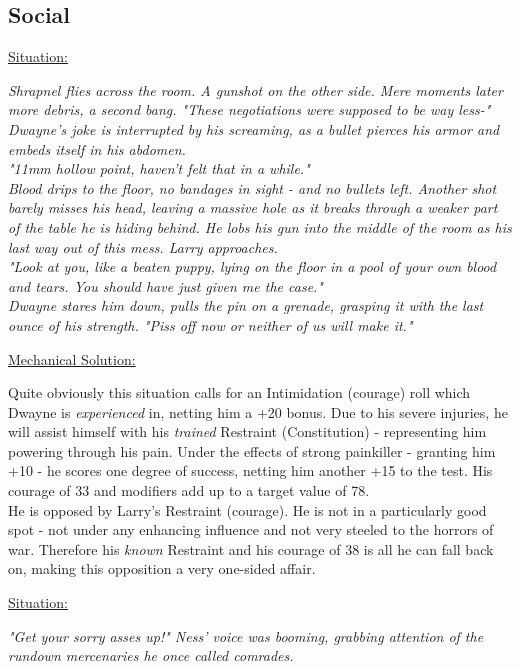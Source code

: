 \pagebreak
\begin{multicols}{2}
	\subsection*{Social}
	\ul{Situation:}
	\begin{exampleblock}
		\textit{Shrapnel flies across the room. A gunshot on the other side. Mere moments later more debris, a second bang.
			"These negotiations were supposed to be way less-"\\
			Dwayne's joke is interrupted by his screaming, as a bullet pierces his armor and embeds itself in his abdomen.\\
			"11mm hollow point, haven't felt that in a while."\\
			Blood drips to the floor, no bandages in sight - and no bullets left. Another shot barely misses his head, leaving a massive hole as it breaks through a weaker part of the table he is hiding behind. He lobs his gun into the middle of the room as his last way out of this mess. Larry approaches.\\
			"Look at you, like a beaten puppy, lying on the floor in a pool of your own blood and tears. You should have just given me the case."\\
			Dwayne stares him down, pulls the pin on a grenade, grasping it with the last ounce of his strength.
			"Piss off now or neither of us will make it."}
	\end{exampleblock}
	\ul{Mechanical Solution:}
	\begin{exampleblock}
		Quite obviously this situation calls for an Intimidation (courage) roll which Dwayne is \emph{experienced} in, netting him a +20 bonus. Due to his severe injuries, he will assist himself with his \emph{trained} Restraint (Constitution) - representing him powering through his pain. Under the effects of strong painkiller - granting him +10 - he scores one degree of success, netting him another +15 to the test. His courage of 33 and modifiers add up to a target value of 78.\\
		He is opposed by Larry's Restraint (courage). He is not in a particularly good spot - not under any enhancing influence and not very steeled to the horrors of war. Therefore his \emph{known} Restraint and his courage of 38 is all he can fall back on, making this opposition a very one-sided affair.
	\end{exampleblock}
	\columnbreak
	\ul{Situation:}
	\begin{exampleblock}
		\textit{"Get your sorry asses up!" Ness' voice was booming, grabbing attention of the rundown mercenaries he once called comrades.\\
}
\end{exampleblock}
\end{multicols}
